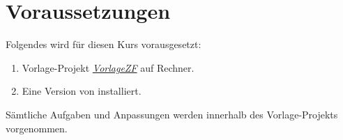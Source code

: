 \section{Voraussetzungen}
Folgendes wird für diesen Kurs vorausgesetzt:
\begin{enumerate}
	\item Vorlage-Projekt \textit{\glqq\href{https://github.com/HSR-Stud/VorlageZFLaTex}{VorlageZF}\grqq} auf Rechner.
	\item Eine Version von \href{https://www.texstudio.org/}{\texstud}installiert.
\end{enumerate}
Sämtliche Aufgaben und Anpassungen werden innerhalb des Vorlage-Projekts vorgenommen. 